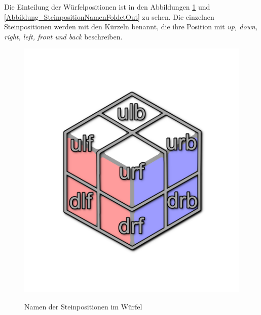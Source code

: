 \documentclass[12pt,a4paper, usenames, dvipsnames]{article}
\theoremstyle{mystyle}
\theoremstyle{definition}
\begin{document}
Die Einteilung der Würfelpositionen ist in den Abbildungen \ref{Abbildung_SteinpositionNamen} und \ref{Abbildung_SteinpositionNamenFoldetOut} zu sehen. Die einzelnen Steinpositionen werden mit den Kürzeln benannt, die ihre Position mit \textit{up, down, right, left, front und back} beschreiben.
\begin{figure}[H]
\centering
\includegraphics[scale=0.14]{caged_positions.png} \\
\caption[Namen der Steinpositionen im Würfel]{Namen der Steinpositionen im Würfel}
\label{Abbildung_SteinpositionNamen}
\end{figure}
\end{document}
